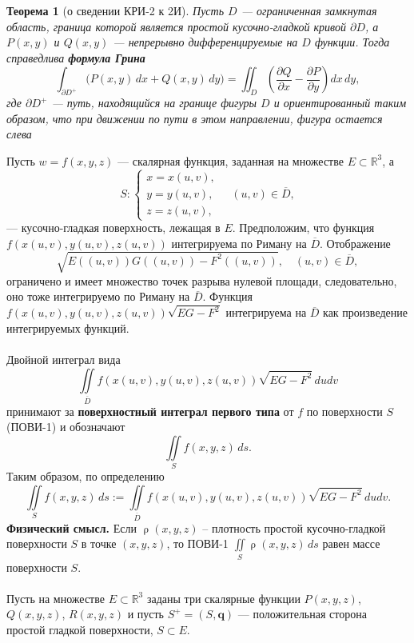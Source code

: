 \documentclass[a4paper, 12pt]{report}
\numberwithin{equation}{section}
\renewcommand{\rho}{\uprho}
\newtheorem*{theorem}{Теорема}
\begin{document}
	\begin{theorem}
		[о сведении КРИ-2 к 2И]
		Пусть $D$ — ограниченная замкнутая область, граница которой является простой кусочно-гладкой кривой $\partial D$, а $P(x, y)$ и $Q(x, y)$ — непрерывно дифференцируемые на $D$ функции. Тогда справедлива \textbf{формула Грина}
		\[
		\int_{\partial D^+} \big(P(x, y) \, dx + Q(x, y) \, dy\big) = \iint_D \left(\frac{\partial Q}{\partial x} - \frac{\partial P}{\partial y}\right) dx \, dy,
		\]
		где $\partial D^+$ — путь, находящийся на границе фигуры $D$ и ориентированный таким образом, что при движении по пути в этом направлении, фигура остается слева 
	\end{theorem}
	Пусть $w = f(x, y, z)$ — скалярная функция, заданная на множестве $E \subset \mathbb{R}^3$, а
	\[
	S: 
	\begin{cases}
		x = x(u, v), \\
		y = y(u, v), \\
		z = z(u, v),
	\end{cases}
	\quad (u, v) \in \overline{D},
	\]
	— кусочно-гладкая поверхность, лежащая в $E$. Предположим, что функция 
	$f(x(u, v), y(u, v), z(u, v))$ интегрируема по Риману на $\overline{D}$. Отображение
	\[
	\sqrt{E((u, v))G((u, v)) - F^2((u, v))}, \quad (u, v) \in \overline{D},
	\]
	ограничено и имеет множество точек разрыва нулевой площади, следовательно, оно тоже интегрируемо по Риману на $\overline{D}$. Функция $f(x(u, v), y(u, v), z(u, v))\sqrt{EG - F^2}$ интегрируема на 
	$\overline{D}$ как произведение интегрируемых функций.
	\\\\
	Двойной интеграл вида
	\[
	\iint\limits_{\overline{D}} f(x(u, v), y(u, v), z(u, v)) \sqrt{EG - F^2} \, dudv
	\]
	принимают за \textbf{поверхностный интеграл первого типа} от $f$ по поверхности $S$ (ПОВИ-1) и обозначают
	\[
	\iint\limits_{S} f(x, y, z) \, ds.
	\]
	Таким образом, по определению
	\[
	\iint\limits_{S} f(x, y, z) \, ds := \iint\limits_{\overline{D}} f(x(u, v), y(u, v), z(u, v)) \sqrt{EG - F^2} \, dudv.
	\]
	\textbf{Физический смысл.} Если $\rho(x,y,z)$ -- плотность простой кусочно-гладкой поверхности $S$ в точке $(x,y,z)$, то ПОВИ-1 $\iint\limits_{S} \rho(x, y, z) \, ds$ равен массе поверхности $S$.
	\\\\
	Пусть на множестве $E \subset \mathbb{R}^3$ заданы три скалярные функции 
	$P(x, y, z)$, $Q(x, y, z)$, $R(x, y, z)$ и пусть $S^+ = (S, \mathbf{q})$ — положительная сторона 
	простой гладкой поверхности, $S \subset E$.
	\\\\
\end{document}
